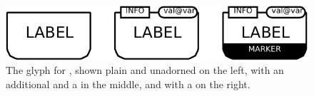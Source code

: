 \begin{figure}[H]
  \centering
  \includegraphics{images/build/genetic_combined}%
  \caption{The \PD glyph for , shown plain and unadorned on the left, with an additional  and a  in the middle, and with a  on the right.}
  \label{fig:genetic}
\end{figure}

